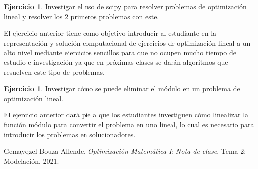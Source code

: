 \documentclass[a4paper,10pt,twocolumn]{article}
\theoremstyle{theorem}
\theoremstyle{definition}
\newtheorem{ejer}[thm]{Ejercicio}
\theoremstyle{remark}
\begin{document}
%
%
%
\begin{ejer}
	Investigar el uso de scipy para resolver problemas de optimización lineal y resolver los 2 primeros problemas con este.
\end{ejer}
El ejercicio anterior tiene como objetivo introducir al estudiante en la representación y solución computacional de ejercicios de optimización lineal a un alto nivel mediante ejercicios sencillos para que no ocupen mucho tiempo de estudio e investigación ya que en próximas clases se darán algoritmos que resuelven este tipo de problemas.

\begin{ejer}
	Investigar cómo se puede eliminar el módulo en un problema de optimización lineal. 
\end{ejer}
El ejercicio anterior dará pie a que los estudiantes investiguen cómo linealizar la función módulo para convertir el problema en uno lineal, lo cual es necesario para introducir los problemas en solucionadores.



\begin{thebibliography}{99}
	
	 Gemayqzel Bouza Allende. \emph{Optimización Matemática I: Nota de clase}.
		Tema 2: Modelación, 2021.

\end{thebibliography}

\label{end}
\end{document}
